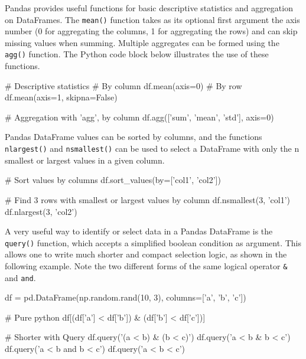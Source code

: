 

Pandas provides useful functions for basic descriptive statistics and aggregation on DataFrames. The \texttt{mean()} function takes as its optional first argument the axis number (0 for aggregating the columns, 1 for aggregating the rows) and can skip missing values when summing. Multiple aggregates can be formed using the \texttt{agg()} function. The Python code block below illustrates the use of these functions.

\begin{pythoncode}
# Descriptive statistics
# By column
df.mean(axis=0)
# By row
df.mean(axis=1, skipna=False)

# Aggregation with 'agg', by column
df.agg(['sum', 'mean', 'std'], axis=0)
\end{pythoncode}

Pandas DataFrame values can be sorted by columns, and the functions \texttt{nlargest()} and \texttt{nsmallest()} can be used to select a DataFrame with only the n smallest or largest values in a given column.

\begin{pythoncode}
# Sort values by columns
df.sort_values(by=['col1', 'col2'])

# Find 3 rows with smallest or largest values by column
df.nsmallest(3, 'col1')
df.nlargest(3, 'col2')
\end{pythoncode}

A very useful way to identify or select data in a Pandas DataFrame is the \texttt{query()} function, which accepts a simplified boolean condition as argument. This allows one to write much shorter and compact selection logic, as shown in the following example. Note the two different forms of the same logical operator \texttt{\&} and \texttt{and}.

\begin{pythoncode}
df = pd.DataFrame(np.random.rand(10, 3), columns=['a', 'b', 'c'])

# Pure python
df[(df['a'] < df['b']) & (df['b'] < df['c'])]

# Shorter with Query
df.query('(a < b) & (b < c)')
df.query('a < b & b < c')
df.query('a < b and b < c')
df.query('a < b < c')
\end{pythoncode}

